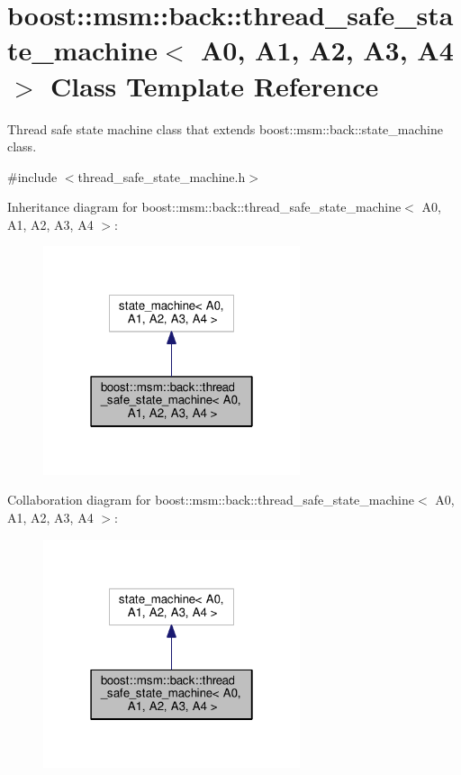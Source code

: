 \hypertarget{classboost_1_1msm_1_1back_1_1thread__safe__state__machine}{\section{boost\-:\-:msm\-:\-:back\-:\-:thread\-\_\-safe\-\_\-state\-\_\-machine$<$ A0, A1, A2, A3, A4 $>$ Class Template Reference}
\label{classboost_1_1msm_1_1back_1_1thread__safe__state__machine}
}


Thread safe state machine class that extends boost\-::msm\-::back\-::state\-\_\-machine class.  




{\ttfamily \#include $<$thread\-\_\-safe\-\_\-state\-\_\-machine.\-h$>$}



Inheritance diagram for boost\-:\-:msm\-:\-:back\-:\-:thread\-\_\-safe\-\_\-state\-\_\-machine$<$ A0, A1, A2, A3, A4 $>$\-:\nopagebreak
\begin{figure}[H]
\begin{center}
\leavevmode
\includegraphics[width=214pt]{classboost_1_1msm_1_1back_1_1thread__safe__state__machine__inherit__graph}
\end{center}
\end{figure}


Collaboration diagram for boost\-:\-:msm\-:\-:back\-:\-:thread\-\_\-safe\-\_\-state\-\_\-machine$<$ A0, A1, A2, A3, A4 $>$\-:\nopagebreak
\begin{figure}[H]
\begin{center}
\leavevmode
\includegraphics[width=214pt]{classboost_1_1msm_1_1back_1_1thread__safe__state__machine__coll__graph}
\end{center}
\end{figure}
